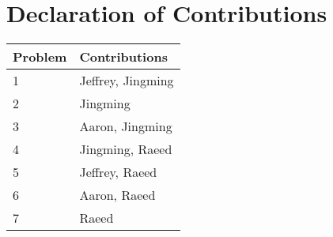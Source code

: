 \section*{Declaration of Contributions}
\begin{table}[htp]
\centering
\begin{tabular}{|l|l|}
\hline
    Problem & Contributions         \\ \hline
    1       & Jeffrey, Jingming     \\ \hline
    2       & Jingming              \\ \hline
    3       & Aaron, Jingming       \\ \hline
    4       & Jingming, Raeed       \\ \hline
    5       & Jeffrey, Raeed        \\ \hline
    6       & Aaron, Raeed          \\ \hline
    7       & Raeed                 \\ \hline
\end{tabular}
\end{table}